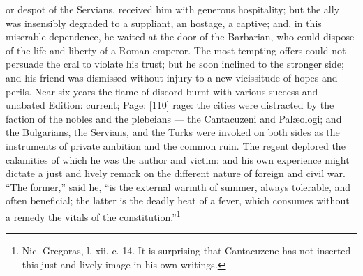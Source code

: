 or despot of the Servians, received him with generous hospitality; but the ally was insensibly degraded to a suppliant, an hostage, a captive; and, in this miserable dependence, he waited at the door of the Barbarian, who could dispose of the life and liberty of a Roman emperor. The most tempting offers could not persuade the cral to violate his trust; but he soon inclined to the stronger side; and his friend was dismissed without injury to a new vicissitude of hopes and perils. Near six years the flame of discord burnt with various success and unabated Edition: current; Page: [110] rage: the cities were distracted by the faction of the nobles and the plebeians \texthebrew{—} the Cantacuzeni and Palæologi; and the Bulgarians, the Servians, and the Turks were invoked on both sides as the instruments of private ambition and the common ruin. The regent deplored the calamities of which he was the author and victim: and his own experience might dictate a just and lively remark on the different nature of foreign and civil war. \texthebrew{“}The former,\texthebrew{}” said he, \texthebrew{“}is the external warmth of summer, always tolerable, and often beneficial; the latter is the deadly heat of a fever, which consumes without a remedy the vitals of the constitution.\texthebrew{}”\footnote{Nic. Gregoras, l. xii. c. 14. It is surprising that Cantacuzene has not inserted this just and lively image in his own writings.}

